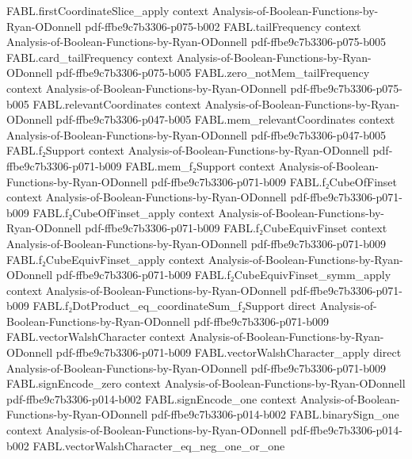 \begin{theorem}
\proofstep
  {FABL.firstCoordinateSlice_apply}
  {context}
  {Analysis-of-Boolean-Functions-by-Ryan-ODonnell}
  {pdf-ffbe9c7b3306-p075-b002}
\proofstep
  {FABL.tailFrequency}
  {context}
  {Analysis-of-Boolean-Functions-by-Ryan-ODonnell}
  {pdf-ffbe9c7b3306-p075-b005}
\proofstep
  {FABL.card_tailFrequency}
  {context}
  {Analysis-of-Boolean-Functions-by-Ryan-ODonnell}
  {pdf-ffbe9c7b3306-p075-b005}
\proofstep
  {FABL.zero_notMem_tailFrequency}
  {context}
  {Analysis-of-Boolean-Functions-by-Ryan-ODonnell}
  {pdf-ffbe9c7b3306-p075-b005}
\proofstep
  {FABL.relevantCoordinates}
  {context}
  {Analysis-of-Boolean-Functions-by-Ryan-ODonnell}
  {pdf-ffbe9c7b3306-p047-b005}
\proofstep
  {FABL.mem_relevantCoordinates}
  {context}
  {Analysis-of-Boolean-Functions-by-Ryan-ODonnell}
  {pdf-ffbe9c7b3306-p047-b005}
\proofstep
  {FABL.f₂Support}
  {context}
  {Analysis-of-Boolean-Functions-by-Ryan-ODonnell}
  {pdf-ffbe9c7b3306-p071-b009}
\proofstep
  {FABL.mem_f₂Support}
  {context}
  {Analysis-of-Boolean-Functions-by-Ryan-ODonnell}
  {pdf-ffbe9c7b3306-p071-b009}
\proofstep
  {FABL.f₂CubeOfFinset}
  {context}
  {Analysis-of-Boolean-Functions-by-Ryan-ODonnell}
  {pdf-ffbe9c7b3306-p071-b009}
\proofstep
  {FABL.f₂CubeOfFinset_apply}
  {context}
  {Analysis-of-Boolean-Functions-by-Ryan-ODonnell}
  {pdf-ffbe9c7b3306-p071-b009}
\proofstep
  {FABL.f₂CubeEquivFinset}
  {context}
  {Analysis-of-Boolean-Functions-by-Ryan-ODonnell}
  {pdf-ffbe9c7b3306-p071-b009}
\proofstep
  {FABL.f₂CubeEquivFinset_apply}
  {context}
  {Analysis-of-Boolean-Functions-by-Ryan-ODonnell}
  {pdf-ffbe9c7b3306-p071-b009}
\proofstep
  {FABL.f₂CubeEquivFinset_symm_apply}
  {context}
  {Analysis-of-Boolean-Functions-by-Ryan-ODonnell}
  {pdf-ffbe9c7b3306-p071-b009}
\proofstep
  {FABL.f₂DotProduct_eq_coordinateSum_f₂Support}
  {direct}
  {Analysis-of-Boolean-Functions-by-Ryan-ODonnell}
  {pdf-ffbe9c7b3306-p071-b009}
\proofstep
  {FABL.vectorWalshCharacter}
  {context}
  {Analysis-of-Boolean-Functions-by-Ryan-ODonnell}
  {pdf-ffbe9c7b3306-p071-b009}
\proofstep
  {FABL.vectorWalshCharacter_apply}
  {direct}
  {Analysis-of-Boolean-Functions-by-Ryan-ODonnell}
  {pdf-ffbe9c7b3306-p071-b009}
\proofstep
  {FABL.signEncode_zero}
  {context}
  {Analysis-of-Boolean-Functions-by-Ryan-ODonnell}
  {pdf-ffbe9c7b3306-p014-b002}
\proofstep
  {FABL.signEncode_one}
  {context}
  {Analysis-of-Boolean-Functions-by-Ryan-ODonnell}
  {pdf-ffbe9c7b3306-p014-b002}
\proofstep
  {FABL.binarySign_one}
  {context}
  {Analysis-of-Boolean-Functions-by-Ryan-ODonnell}
  {pdf-ffbe9c7b3306-p014-b002}
\proofstep
  {FABL.vectorWalshCharacter_eq_neg_one_or_one}

\end{theorem}
